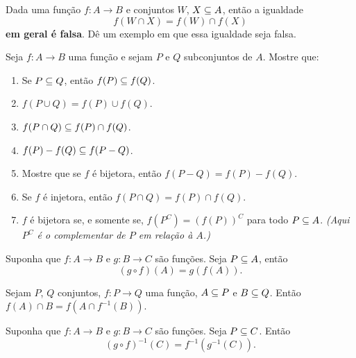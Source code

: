 \documentclass[12pt]{exam}
\begin{document}
    \questao{} Dada uma fun\c{c}\~ao $f : A \to B$ e conjuntos $W$, $X \subseteq A$, ent\~ao a igualdade
    \[
        f(W \cap X) = f(W) \cap f(X)
    \]
    \textbf{em geral \'e falsa}. D\^e um exemplo em que essa igualdade seja falsa.

    \vspace{.3cm}

    \questao{} Seja $f : A \to B$ uma fun\c{c}\~ao e sejam $P$ e $Q$ subconjuntos de $A$. Mostre que:
    \begin{enumerate}[label={\alph*})]
        \item Se $P\subseteq Q$, ent{\~a}o $f(P)\subseteq f(Q)$.
        \item $f(P\cup Q) = f(P)\cup f(Q)$.

        \item $f(P\cap Q)\subseteq f(P)\cap f(Q)$.

        \item $f(P) - f(Q) \subseteq f(P - Q)$.

        \item Mostre que se $f$ é bijetora, então $f(P - Q) = f(P) - f(Q)$.

        \item Se $f$ {\'e} injetora, ent{\~a}o $f(P\cap Q) =  f(P)\cap f(Q)$.

        \item $f$ {\'e} bijetora se, e somente se, $f(P^C) = (f(P))^C$ para todo $P \subseteq A$. \textit{(Aqui $P^C$ \'e o complementar de $P$ em rela\c{c}\~ao \`a $A$.)}
    \end{enumerate}

    \vspace{.3cm}

    \questao{} Suponha que $f : A \to B$ e $g : B \to C$ são funções. Seja $P \subseteq A$, então
    \[
        (g \circ f)(A) = g(f(A)).
    \]

    \vspace{.3cm}

    \questao{} Sejam $P$, $Q$ conjuntos, $f : P \to Q$ uma função, $A \subseteq P$ e $B \subseteq Q$. Então $f(A) \cap B = f(A \cap f^{-1}(B))$.

    \vspace{.3cm}

    \questao{} Suponha que $f : A \to B$ e $g : B \to C$ são funções. Seja $P \subseteq C$. Então
    \[
        (g \circ f)^{-1}(C) = f^{-1}(g^{-1}(C)).
    \]

    \newpage
\end{document}
